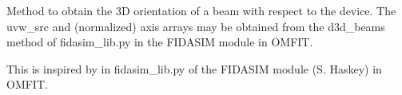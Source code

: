\documentclass[letterpaper,10pt,english]{sphinxmanual}
\begin{document}
\begin{fulllineitems}
\label{\detokenize{aurora:aurora.nbi_neutrals.beam_grid}}
Method to obtain the 3D orientation of a beam with respect to the device.
The uvw\_src and (normalized) axis arrays may be obtained from the d3d\_beams method
of fidasim\_lib.py in the FIDASIM module in OMFIT.

This is inspired by  in fidasim\_lib.py of the FIDASIM module (S. Haskey) 
in OMFIT.

\end{fulllineitems}

\end{document}
